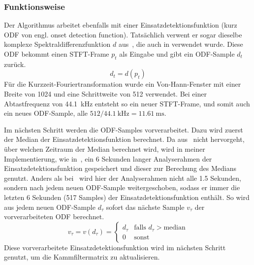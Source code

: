 {{		\subsubsection*{Funktionsweise}
		{
			Der Algorithmus  arbeitet ebenfalls mit einer Einsatzdetektionsfunktion (kurz ODF von engl. onset detection function).
			Tatsächlich verwent er sogar dieselbe komplexe Spektraldifferenzfunktion $d$ aus~\cite{2004_BeDaDuSa},
				die auch in \cite{2009_DaPlSt} verwendet wurde.
			Diese ODF bekommt einen STFT-Frame $p_t$ als Eingabe und gibt ein ODF-Sample $d_t$ zurück.
			\begin{equation}
				d_t = d(p_t)
			\end{equation}
			Für die Kurzzeit-Fouriertransformation wurde ein Von-Hann-Fenster mit einer Breite von \num{1024} und eine Schrittweite von \num{512} verwendet.
			Bei einer Abtastfrequenz von \SI{44.1}{\kilo\hertz} entsteht so ein neuer STFT-Frame,
				und somit auch ein neues ODF-Sample,
				alle $512 / \SI{44.1}{\kilo\hertz} = \SI{11.61}{\milli\second}$.

			Im nächsten Schritt werden die ODF-Samples vorverarbeitet.
			Dazu wird zuerst der Median der Einsatzdetektionsfunktion berechnet.
			Da aus~\cite{2011_PlRoSt} nicht hervorgeht, über welchen Zeitraum der Median berechnet wird,
				wird in meiner Implementierung,
				wie in~\cite{2009_DaPlSt},
				ein \num{6} Sekunden langer Analyserahmen der Einsatzdetektionsfunktion gespeichert
				und dieser zur Berechung des Medians genutzt.
			Anders als bei~\cite{2009_DaPlSt} wird hier der Analyserahmen nicht alle \num{1.5} Sekunden,
				sondern nach jedem neuen ODF-Sample weitergeschoben,
				sodass er immer die letzten \num{6} Sekunden (\num{517} Samples) der Einsatzdetektionsfunktion enthält.
			So wird aus jedem neuen ODF-Sample $d_\tau$ sofort das nächste Sample $v_\tau$ der vorverarbeiteten ODF berechnet.
			\begin{equation}
				v_\tau = v(d_\tau) =
				\begin{cases}
					d_\tau & \text{falls } d_\tau > \text{median} \\
					0    & \text{sonst}
				\end{cases}
			\end{equation}
			Diese vorverarbeitete Einsatzdetektionsfunktion wird im nächsten Schritt genutzt,
				um die Kammfiltermatrix zu aktualisieren.

}}}
